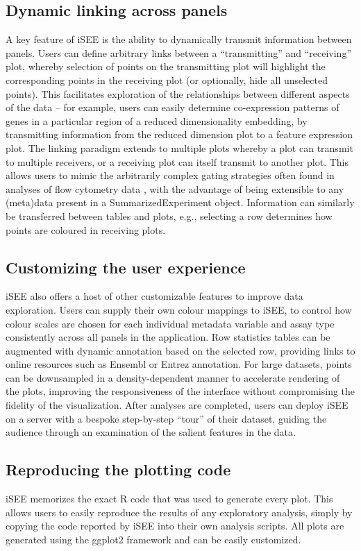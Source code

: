 \documentclass{bioinfo}
\begin{document}
\subsection{Dynamic linking across panels}
A key feature of iSEE is the ability to dynamically transmit information between panels. 
Users can define arbitrary links between a ``transmitting'' and ``receiving'' plot, whereby selection of points on the transmitting plot will highlight the corresponding points in the receiving plot (or optionally, hide all unselected points). 
This facilitates exploration of the relationships between different aspects of the data -- for example, users can easily determine co-expression patterns of genes in a particular region of a reduced dimensionality embedding, by transmitting information from the reduced dimension plot to a feature expression plot. 
The linking paradigm extends to multiple plots whereby a plot can transmit to multiple receivers, or a receiving plot can itself transmit to another plot.
This allows users to mimic the arbitrarily complex gating strategies often found in analyses of flow cytometry data \citep{finak2014opencyto}, with the advantage of being extensible to any (meta)data present in a SummarizedExperiment object. 
Information can similarly be transferred between tables and plots, e.g., selecting a row determines how points are coloured in receiving plots.

\subsection{Customizing the user experience}
iSEE also offers a host of other customizable features to improve data exploration. 
Users can supply their own colour mappings to iSEE, to control how colour scales are chosen for each individual  metadata variable and assay type consistently across all panels in the application. 
Row statistics tables can be augmented with dynamic annotation based on the selected row, providing links to online resources such as Ensembl or Entrez annotation. 
For large datasets, points can be downsampled in a density-dependent manner to accelerate rendering of the plots, improving the responsiveness of the interface without compromising the fidelity of the visualization. 
After analyses are completed, users can deploy iSEE on a server with a bespoke step-by-step ``tour'' of their dataset, guiding the audience through an examination of the salient features in the data.

\subsection{Reproducing the plotting code}
iSEE memorizes the exact R code that was used to generate every plot. 
This allows users to easily reproduce the results of any exploratory analysis, simply by copying the code reported by iSEE into their own analysis scripts. 
All plots are generated using the ggplot2 framework and can be easily customized. 
\end{document}
